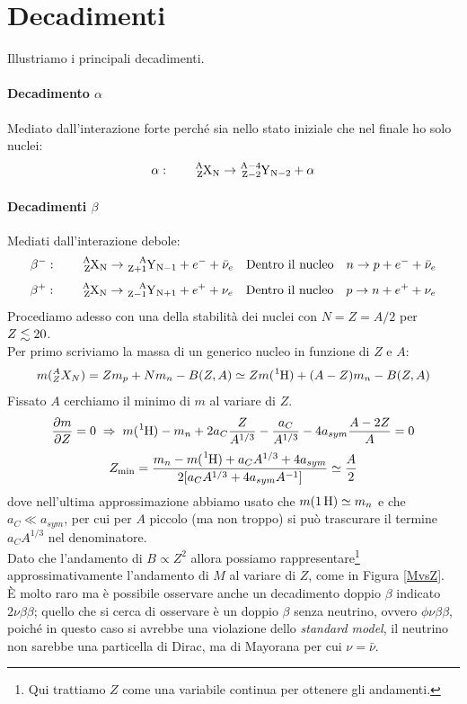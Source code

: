 \section{Decadimenti}
Illustriamo i principali decadimenti.

\paragraph{Decadimento $\alpha$} Mediato dall'interazione forte perché sia nello stato iniziale che nel finale ho solo nuclei:
$$\alpha: \qquad \ce{^A_ZX_N} \to \ce{^{A-4}_{Z-2}Y_{N-2}} + \alpha $$
\paragraph{Decadimenti $\beta$} Mediati dall'interazione debole:
$$\beta^-: \qquad \ce{^A_ZX_N} \to \ce{^{A}_{Z+1}Y_{N-1}} + e^- + \bar{\nu}_e \quad \text{Dentro il nucleo}\quad n \to p + e^- + \bar{\nu}_e $$
$$\beta^+: \qquad \ce{^A_ZX_N} \to \ce{^{A}_{Z-1}Y_{N+1}} + e^+ + \nu_e \quad \text{Dentro il nucleo}\quad p \to n + e^+ + \nu_e$$
\noindent Procediamo adesso con una  della stabilità dei nuclei con $N=Z=A/2$ per $Z\lesssim 20$.\\
Per primo scriviamo la massa di un generico nucleo in funzione di $Z$ e $A$:
$$m(\nuc{X}{A}{Z}{N}) = Zm_p + Nm_n - B(Z,A) \simeq Z m(\ce{^1H}) + (A-Z)m_n- B(Z,A)$$
Fissato $A$ cerchiamo il minimo di $m$ al variare di $Z$.
$$\frac{\partial m}{\partial Z} = 0 \;\Rightarrow\; m(\ce{^1H})-m_n + 2a_C \frac{Z}{A^{1/3}} - \frac{a_C}{A^{1/3}}-4a_{sym}\frac{A-2Z}{A} = 0$$
$$Z_{\min} = \frac{m_n - m(\ce{^1H})+a_C A^{1/3}+4 a_{sym}}{2[a_CA^{1/3}+4a_{sym}A^{-1}]}\simeq \frac{A}{2}$$
dove nell'ultima approssimazione abbiamo usato che $m(\ce{1H})\simeq m_n$ e che $a_C\ll a_{sym}$, per cui per $A$ piccolo (ma non troppo) si può trascurare il termine $a_C A^{1/3}$ nel denominatore.\\
Dato che l'andamento di $B\propto Z^2$ allora possiamo rappresentare\footnote{Qui trattiamo $Z$ come una variabile continua per ottenere gli andamenti.} approssimativamente l'andamento di $M$ al variare di $Z$, come in Figura \ref{MvsZ}.\\
È molto raro ma è possibile osservare anche un decadimento doppio $\beta$ indicato $2\nu\beta\beta$; quello che si cerca di osservare è un doppio $\beta$ senza neutrino, ovvero $\phi \nu \beta\beta$, poiché in questo caso si avrebbe una violazione dello \textit{standard model}, il neutrino non sarebbe una particella di Dirac, ma di Mayorana per cui $\nu = \bar{\nu}$.

